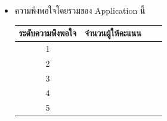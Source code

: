\documentclass[14pt,oneside,openright,a4paper]{cpe-thai-project}
\begin{document}
\begin{itemize}
  \item ความพึงพอใจโดยรวมของ Application นี้
  \begin{table}[!h]
    \centering
    \captionsetup{justification=centering} %
    \begin{tabular}{|c|c|c|c|}
      \hline
      \multicolumn{1}{|c|}{\cellcolor[HTML]{9FC5E8}ระดับความพึงพอใจ} &
        \multicolumn{1}{c|}{\cellcolor[HTML]{9FC5E8}จำนวนผู้ให้คะแนน} \\ \hline
       1 & 
         \\ \hline 
       2 & 
         \\ \hline 
       3 & 
         \\ \hline 
       4 & 
         \\ \hline 
       5 & 
         \\ \hline
    \end{tabular}
    \label{tab:Featuresatisfaction}
  \end{table}
\end{itemize}
\newpage
\end{document}

